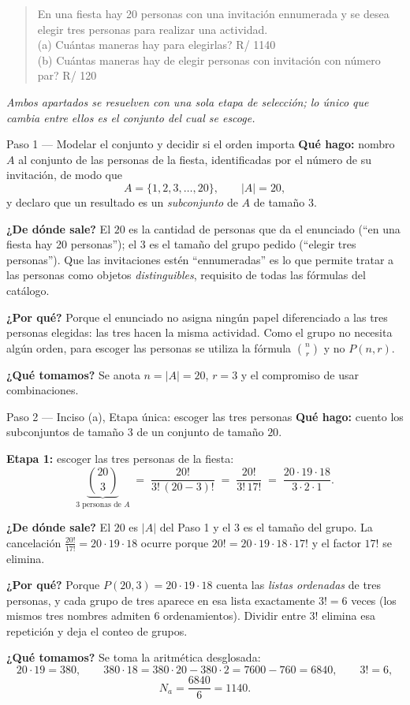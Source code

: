 \documentclass[11pt]{article}
\begin{document}
\begin{quote}
En una fiesta hay 20 personas con una invitación ennumerada y se desea elegir tres personas para realizar una actividad.\\[2pt]
(a) Cuántas maneras hay para elegirlas? \hfill R/ 1140\\
(b) Cuántas maneras hay de elegir personas con invitación con número par? \hfill R/ 120
\end{quote}

\emph{Ambos apartados se resuelven con una sola etapa de selección; lo único que cambia entre ellos es el conjunto del cual se escoge.}

\begin{paso}{Paso 1 --- Modelar el conjunto y decidir si el orden importa}
\textbf{Qué hago:} nombro $A$ al conjunto de las personas de la fiesta, identificadas por el número de su invitación, de modo que
\[
  A=\{1,2,3,\dots,20\},\qquad |A|=20 ,
\]
y declaro que un resultado es un \emph{subconjunto} de $A$ de tamaño $3$.

\textbf{¿De dónde sale?} El $20$ es la cantidad de personas que da el enunciado (``en una fiesta hay 20 personas''); el $3$ es el tamaño del grupo pedido (``elegir tres personas''). Que las invitaciones estén ``ennumeradas'' es lo que permite tratar a las personas como objetos \emph{distinguibles}, requisito de todas las fórmulas del catálogo.

\textbf{¿Por qué?} Porque el enunciado no asigna ningún papel diferenciado a las tres personas elegidas: las tres hacen la misma actividad. Como el grupo no necesita algún orden, para escoger las personas se utiliza la fórmula $\binom{n}{r}$ y no $P(n,r)$.

\textbf{¿Qué tomamos?} Se anota $n=|A|=20$, $r=3$ y el compromiso de usar combinaciones.
\end{paso}

\begin{paso}{Paso 2 --- Inciso (a), Etapa única: escoger las tres personas}
\textbf{Qué hago:} cuento los subconjuntos de tamaño $3$ de un conjunto de tamaño $20$.

\medskip
\textbf{Etapa 1:} escoger las tres personas de la fiesta:
\[
  \underbrace{\binom{20}{3}}_{\text{3 personas de }A} \;=\; \frac{20!}{3!\,(20-3)!} \;=\; \frac{20!}{3!\,17!} \;=\; \frac{20\cdot 19\cdot 18}{3\cdot 2\cdot 1} .
\]

\textbf{¿De dónde sale?} El $20$ es $|A|$ del Paso 1 y el $3$ es el tamaño del grupo. La cancelación $\frac{20!}{17!}=20\cdot 19\cdot 18$ ocurre porque $20!=20\cdot 19\cdot 18\cdot 17!$ y el factor $17!$ se elimina.

\textbf{¿Por qué?} Porque $P(20,3)=20\cdot 19\cdot 18$ cuenta las \emph{listas ordenadas} de tres personas, y cada grupo de tres aparece en esa lista exactamente $3!=6$ veces (los mismos tres nombres admiten $6$ ordenamientos). Dividir entre $3!$ elimina esa repetición y deja el conteo de grupos.

\textbf{¿Qué tomamos?} Se toma la aritmética desglosada:
\[
  20\cdot 19 = 380,\qquad 380\cdot 18 = 380\cdot 20 - 380\cdot 2 = 7600-760 = 6840,\qquad 3!=6,
\]
\[
  N_a=\frac{6840}{6}=1140 .
\]
\end{paso}
\end{document}
